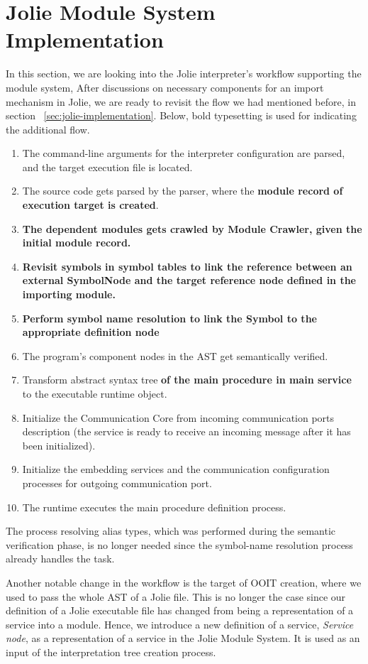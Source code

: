 
\section{Jolie Module System Implementation}

In this section, we are looking into the Jolie interpreter's workflow supporting the module system, After discussions on necessary components for an import mechanism in Jolie, we are ready to revisit the flow we had mentioned before, in section ~\ref{sec:jolie-implementation}. Below, bold typesetting is used for indicating the additional flow.

\begin{enumerate}
    \item The command-line arguments for the interpreter configuration are parsed, and the target execution file is located.
    \item The source code gets parsed by the parser, where the \textbf{module record of execution target is created}.
    \item \textbf{The dependent modules gets crawled by Module Crawler, given the initial module record.}
    \item \textbf{Revisit symbols in symbol tables to link the reference between an external SymbolNode and the target reference node defined in the importing module.}
    \item \textbf{Perform symbol name resolution to link the Symbol to the appropriate definition node}
    \item The program's component nodes in the AST get semantically verified.
    \item Transform abstract syntax tree \textbf{of the main procedure in main service} to the executable runtime object.
    \item Initialize the Communication Core from incoming communication ports description (the service is ready to receive an incoming message after it has been initialized).
    \item Initialize the embedding services and the communication configuration processes for outgoing communication port.
    \item The runtime executes the main procedure definition process.
\end{enumerate}

The process resolving alias types, which was performed during the semantic verification phase, is no longer needed since the symbol-name resolution process already handles the task.

Another notable change in the workflow is the target of OOIT creation, where we used to pass the whole AST of a Jolie file. This is no longer the case since our definition of a Jolie executable file has changed from being a representation of a service into a module.
Hence, we introduce a new definition of a service, \textit{Service node}, as a representation of a service in the Jolie Module System. It is used as an input of the interpretation tree creation process.